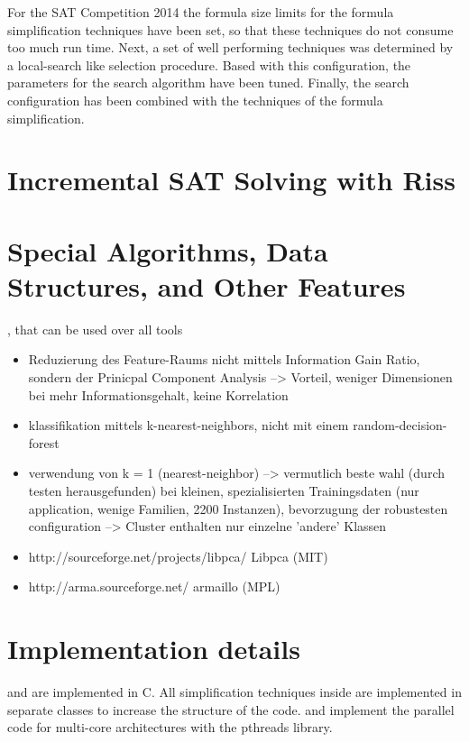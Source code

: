 \documentclass[conference]{IEEEtran}
\def\CC{{C\nolinebreak[4]\hspace{-.05em}\raisebox{.4ex}{\tiny\bf ++}}}
\begin{document}
For the SAT Competition 2014 the formula size limits for the formula simplification techniques have been set, so that these techniques do not consume too much run time.
Next, a set of well performing techniques was determined by a local-search like selection procedure. 
Based with this configuration, the parameters for the search algorithm have been tuned. 
Finally, the search configuration has been combined with the techniques of the formula simplification. 

\section{Incremental SAT Solving with Riss}


\section{Special Algorithms, Data Structures, and Other Features}

, that can be used over all tools
\begin{itemize}
	\item Reduzierung des Feature-Raums nicht mittels Information Gain Ratio, sondern der Prinicpal Component Analysis --> Vorteil, weniger Dimensionen bei mehr Informationsgehalt, keine Korrelation
	\item klassifikation mittels k-nearest-neighbors, nicht mit einem random-decision-forest
	\item verwendung von k = 1 (nearest-neighbor) --> vermutlich beste wahl (durch testen herausgefunden) bei kleinen, spezialisierten Trainingsdaten (nur application, wenige Familien, 2200 Instanzen), bevorzugung der robustesten configuration --> Cluster enthalten nur einzelne 'andere' Klassen
	\item http://sourceforge.net/projects/libpca/ Libpca (MIT)
	\item http://arma.sourceforge.net/ armaillo (MPL)
\end{itemize}
\section{Implementation details}

\riss and \coprocessor are implemented in \CC. 
All simplification techniques inside \coprocessor are implemented in separate classes to increase the structure of the code. 
\priss and \pcasso implement the parallel code for multi-core architectures with the pthreads library.
 
\end{document}
